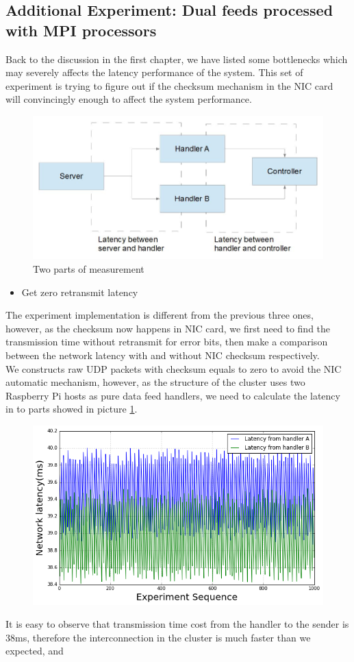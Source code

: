 \documentclass[11pt,openright,a4paper]{report}
\begin{document}
\subsection{Additional Experiment: Dual feeds processed with MPI processors}
Back to the discussion in the first chapter, we have listed some bottlenecks which may severely affects the latency performance of the system. This set of experiment is trying to figure out if the checksum mechanism in the NIC card will convincingly enough to affect the system performance.\\
\begin{figure}[H]
	\centering
	\includegraphics[width=0.7\linewidth]{picture/addExperi}
	\caption{Two parts of measurement}
	\label{fig:addExperi}
\end{figure}
\begin{itemize}
	\item[1.] Get zero retransmit latency
\end{itemize}
The experiment implementation is different from the previous three ones, however, as the checksum now happens in NIC card, we first need to find the transmission time without retransmit for error bits, then make a comparison between the network latency with and without NIC checksum respectively.\\
We constructs raw UDP packets with checksum equals to zero to avoid the NIC automatic mechanism, however, as the structure of the cluster uses two Raspberry Pi hosts as pure data feed handlers, we need to calculate the latency in to parts showed in picture \ref{fig:addExperi}.\\
\begin{figure}[H]
	\centering
	\includegraphics[width=0.7\linewidth]{picture/experiments/exp4/latency}
	\caption{}
	\label{fig:latency}
\end{figure}
It is easy to observe that transmission time cost from the handler to the sender is 38ms, therefore the interconnection in the cluster is much faster than we expected, and 
\end{document}
